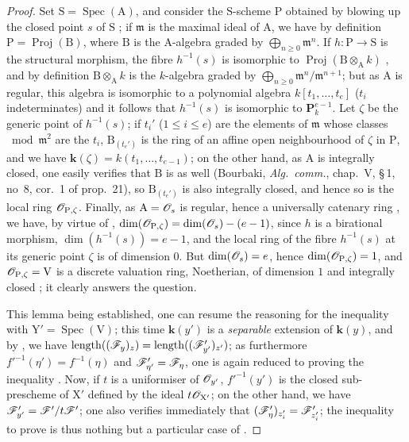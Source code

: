 \begin{proof}
Set $\mathrm{S}=\operatorname{Spec}(\mathrm{A})$, and consider the $\mathrm{S}$-scheme $\mathrm{P}$ obtained by blowing up the closed point $s$ of $\mathrm{S}$ ; if $\mathfrak{m}$ is the maximal ideal of $\mathrm{A}$, we have by definition $\mathrm{P}=\operatorname{Proj}(\mathrm{B})$, where $\mathrm{B}$ is the $\mathrm{A}$-algebra graded by $\bigoplus_{n\geqslant 0}\mathfrak{m}^n$.
If $h:\mathrm{P}\to\mathrm{S}$ is the structural morphism, the fibre $h^{-1}(s)$ is isomorphic to $\operatorname{Proj}(\mathrm{B}\otimes_\mathrm{A} k)$ , and by definition $\mathrm{B}\otimes_\mathrm{A} k$ is the $k$-algebra graded by $\bigoplus_{n\geqslant 0}\mathfrak{m}^n/\mathfrak{m}^{n+1}$; but as $\mathrm{A}$ is regular, this algebra is isomorphic to a polynomial algebra $k[t_1,\ldots,t_e]$ ($t_i$ indeterminates)  and it follows that $h^{-1}(s)$ is isomorphic to $\mathbf{P}_k^{e-1}$.
Let $\zeta$ be the generic point of $h^{-1}(s)$; if $t_i'$ ($1\leqslant i\leqslant e$) are the elements of $\mathfrak{m}$ whose classes $\bmod\mathfrak{m}^2$ are the $t_i$, $\mathrm{B}_{(t_e')}$ is the ring of an affine open neighbourhood of $\zeta$ in $\mathrm{P}$, and we have $\mathbf{k}(\zeta)=k(t_1,\ldots,t_{e-1})$; on the other hand, as $\mathrm{A}$ is integrally closed, one easily verifies that $\mathrm{B}$ is as well (Bourbaki, \emph{Alg.\ comm.}, chap.~V, \S\,1, no~8, cor.~1 of prop.~21), so $\mathrm{B}_{(t_e')}$ is also integrally closed, and hence so is the local ring $\mathscr{O}_{\mathrm{P},\zeta}$.
Finally, as $\mathrm{A}=\mathscr{O}_s$ is regular, hence a universally catenary ring , we have, by virtue of , $\dim(\mathscr{O}_{\mathrm{P},\zeta})=\dim(\mathscr{O}_s)-(e-1)$, since $h$ is a birational morphism, $\dim(h^{-1}(s))=e-1$, and the local ring of the fibre $h^{-1}(s)$ at its generic point $\zeta$ is of dimension $0$.
But $\dim(\mathscr{O}_s)=e$, hence $\dim(\mathscr{O}_{\mathrm{P},\zeta})=1$, and $\mathscr{O}_{\mathrm{P},\zeta}=\mathrm{V}$ is a discrete valuation ring, Noetherian, of dimension $1$ and integrally closed ; it clearly answers the question.

This lemma being established, one can resume the reasoning for the inequality  with $\mathrm{Y}'=\operatorname{Spec}(\mathrm{V})$; this time $\mathbf{k}(y')$ is a \emph{separable} extension of $\mathbf{k}(y)$, and by , we have $\operatorname{length}((\mathscr{F}_y)_z)=\operatorname{length}((\mathscr{F}_{y'}')_{z'})$; as furthermore $f'^{-1}(\eta')=f^{-1}(\eta)$ and $\mathscr{F}_{\eta'}'=\mathscr{F}_\eta$, one is again reduced to proving the inequality .
Now, if $t$ is a uniformiser of $\mathscr{O}_{y'}$, $f'^{-1}(y')$ is the closed sub-prescheme of $\mathrm{X}'$ defined by the ideal $t\mathscr{O}_{\mathrm{X}'}$; on the other hand, we have $\mathscr{F}_{y'}'=\mathscr{F}'/t\mathscr{F}'$; one also verifies immediately  that $(\mathscr{F}_\eta')_{z_i'}=\mathscr{F}_{z_i'}'$; the inequality to prove  is thus nothing but a particular case of .
\end{proof}

